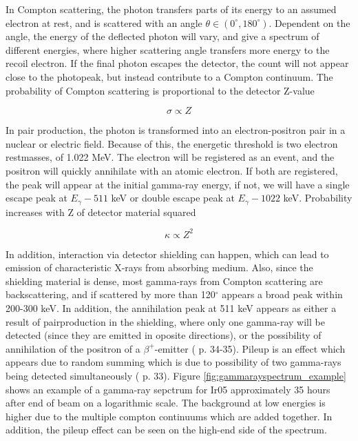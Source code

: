 \noindent In Compton scattering, the photon transfers parts of its energy to an assumed electron at rest, and is scattered with an angle $\theta \in (0^\circ, 180^\circ)$. Dependent on the angle, the energy of the deflected photon will vary, and give a spectrum of different energies, where higher scattering angle transfers more energy to the recoil electron. If the final photon escapes the detector, the count will not appear close to the photopeak, but instead contribute to a Compton continuum. The probability of Compton scattering is proportional to the detector Z-value

\begin{equation}
    \sigma \propto Z
\end{equation}

\noindent 
In pair production, the photon is transformed into an electron-positron pair in a nuclear or electric field. Because of this, the energetic threshold is two electron restmasses, of 1.022 MeV. The electron will be registered as an event, and the positron will quickly annihilate with an atomic electron. If both are registered, the peak will appear at the initial gamma-ray energy, if not, we will have a single escape peak at $E_\gamma-511$ keV or double escape peak at $E_\gamma-1022$ keV. Probability increases with Z of detector material squared 

\begin{equation}
    \kappa\propto Z^2
\end{equation}


In addition, interaction via detector shielding can happen, which can lead to emission of characteristic X-rays from absorbing medium. Also, since the shielding material is dense, most gamma-rays from Compton scattering are backscattering, and if scattered by more than 120$^\circ$ appears a broad peak within 200-300 keV. In addition, the annihilation peak at 511 keV appears as either a result of pairproduction in the shielding, where only one gamma-ray will be detected (since they are emitted in oposite directions), or the possibility of annihilation of the positron of a $\beta^+$-emitter (\cite{Gilmore2008} p. 34-35). Pileup is an effect which appears due to random summing which is due to possibility of two gamma-rays being detected simultaneously (\cite{Gilmore2008} p. 33). Figure \ref{fig:gammarayspectrum_example} shows an example of a gamma-ray sepctrum for Ir05 approximately 35 hours after end of beam on a logarithmic scale. The background at low energies is higher due to the multiple compton continuums which are added together. In addition, the pileup effect can be seen on the high-end side of the spectrum. \\


